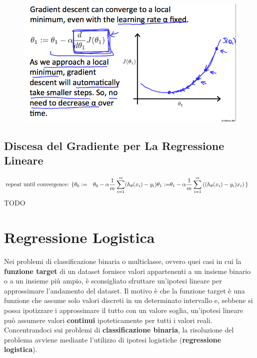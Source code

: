 \begin{figure}[h!]
    \centering
    \includegraphics[width=1\textwidth]{img/RDcJ-KGXEeaVChLw2Vaaug_cb782d34d272321e88f202940c36afe9_Screenshot-2016-11-03-00.06.00.png}
    \caption{}\label{GradientDescent4}
\end{figure}
\subsection{Discesa del Gradiente per La Regressione Lineare}
\begin{align} \text{repeat until convergence: } \lbrace & \newline \theta_0 := & \theta_0 - \alpha \frac{1}{m} \sum\limits_{i=1}^{m}(h_\theta(x_{i}) - y_{i}) \newline \theta_1 := & \theta_1 - \alpha \frac{1}{m} \sum\limits_{i=1}^{m}\left((h_\theta(x_{i}) - y_{i}) x_{i}\right) \newline \rbrace& \end{align}
TODO
\section{Regressione Logistica}
Nei problemi di classificazione binaria o multiclasse, ovvero quei casi in cui la \textbf{funzione target} di un dataset fornisce valori appartenenti a un insieme binario o a un insieme più ampio, è sconsigliato sfruttare un'ipotesi lineare per approssimare l'andamento del dataset. Il motivo è che la funzione target è una funzione che assume solo valori discreti in un determinato intervallo e, sebbene si possa ipotizzare i approssimare il tutto con un valore soglia, un'ipotesi lineare può assumere valori \textbf{continui} ipoteticamente per tutti i valori reali. Concentrandoci sui problemi di \textbf{classificazione binaria}, la risoluzione del problema avviene mediante l'utilizzo di ipotesi logistiche (\textbf{regressione logistica}). 
